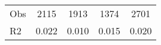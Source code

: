 \begin{tabular}{l*{4}{c}}
\hline                                                                                                                                                                                                                                            
 Obs                   &               2115               &       1913                       &       1374                &              2701                                               \\ 
 R2                    &                      0.022              &              0.010                      &              0.015               &                     0.020                                              \\ 
\hline \end{tabular}                                                                                                                                                                                                              